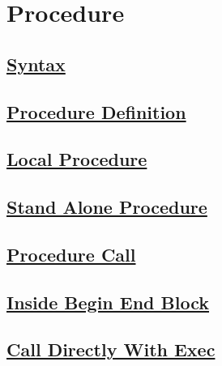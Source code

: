 \vspace{0.5cm}
\section{Procedure}

\subsection*{\underline{Syntax}}

\subsection*{\underline{Procedure Definition}}

\subsection*{\underline{Local Procedure}}





\subsection*{\underline{Stand Alone Procedure}}



\newpage
\subsection*{\underline{Procedure Call}}

\subsection*{\underline{Inside Begin End Block}}



\subsection*{\underline{Call Directly With Exec}}



\vspace{0.35cm}

